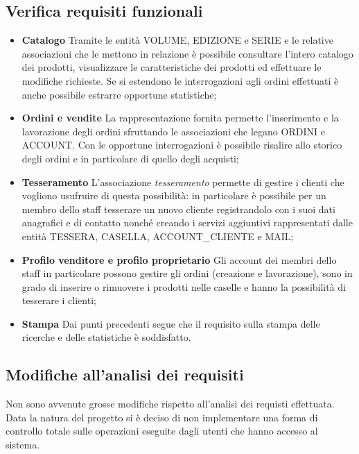 \documentclass[a4paper]{scrartcl}
\begin{document}
\begin{footnotesize}
\subsection*{\color[RGB]{155,0,20}Verifica requisiti funzionali}
\begin{itemize}
\item \textbf{Catalogo} Tramite le entità VOLUME, EDIZIONE e SERIE e le relative associazioni che le mettono in relazione è possibile consultare l'intero catalogo dei prodotti, visualizzare le caratteristiche dei prodotti ed effettuare le modifiche richieste. Se si estendono le interrogazioni agli ordini effettuati è anche possibile estrarre opportune statistiche;

\item \textbf{Ordini e vendite} La rappresentazione fornita permette l'inserimento e la lavorazione degli ordini sfruttando le associazioni che legano ORDINI e ACCOUNT. Con le opportune interrogazioni è possibile risalire allo storico degli ordini e in particolare di quello degli acquisti;

\item \textbf{Tesseramento} L'associazione \textit{tesseramento} permette di gestire i clienti che vogliono usufruire di questa possibilità: in particolare è possibile per un membro dello staff tesserare un nuovo cliente registrandolo con i suoi dati anagrafici e di contatto nonché creando i servizi aggiuntivi rappresentati dalle entità TESSERA, CASELLA, ACCOUNT\_{CLIENTE} e MAIL;

\item \textbf{Profilo venditore e profilo proprietario} Gli account dei membri dello staff in particolare possono gestire gli ordini (creazione e lavorazione), sono in grado di inserire o rimuovere i prodotti nelle caselle e hanno la possibilità di tesserare i clienti;

\item \textbf{Stampa} Dai punti precedenti segue che il requisito sulla stampa delle ricerche e delle statistiche è soddisfatto.
\end{itemize}


\subsection*{\color[RGB]{155,0,20}Modifiche all'analisi dei requisiti}
Non sono avvenute grosse modifiche rispetto all'analisi dei requisti effettuata. Data la natura del progetto si è deciso di non implementare una forma di controllo totale sulle operazioni eseguite dagli utenti che hanno accesso al sistema.

\end{footnotesize}
\end{document}
